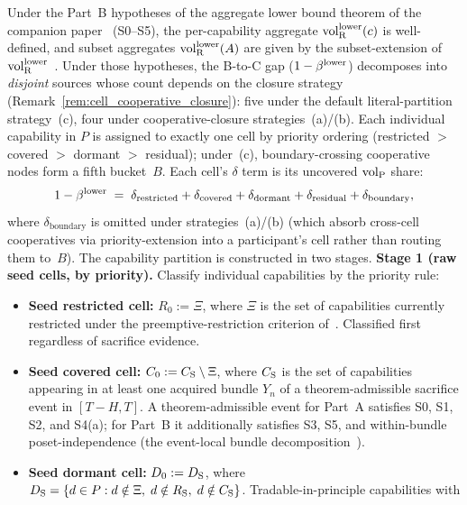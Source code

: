 \begin{definition}
\label{def:gap_decomp}
Under the Part~B hypotheses of the aggregate lower bound
theorem of the companion paper~\citep[Revealed~Sacrifice]{lasser2026paper8a}
(S0--S5), the per-capability aggregate ${\operatorname{vol}_{\mathrm{R}}^{\mathrm{lower}}}(c)$ is
well-defined, and subset aggregates ${\operatorname{vol}_{\mathrm{R}}^{\mathrm{lower}}}(A)$ are given
by the subset-extension of ${\operatorname{vol}_{\mathrm{R}}^{\mathrm{lower}}}$~\citep[Revealed~Sacrifice]{lasser2026paper8a}.  Under those
hypotheses, the B-to-C gap ($1 - \beta^{\mathrm{lower}}$) decomposes into
\emph{disjoint} sources whose count depends on the closure
strategy (Remark~\ref{rem:cell_cooperative_closure}): five
under the default literal-partition strategy~(c), four under
cooperative-closure strategies~(a)/(b).  Each individual
capability in $P$ is assigned to exactly one cell by priority
ordering (restricted $>$ covered $>$ dormant $>$ residual);
under~(c), boundary-crossing cooperative nodes form a fifth
bucket~$B$.  Each cell's $\delta$ term is its uncovered ${\operatorname{vol}_{\mathrm{P}}}$
share:
\[
  1 - \beta^{\mathrm{lower}} \;=\; \delta_{\mathrm{restricted}}
  + \delta_{\mathrm{covered}} + \delta_{\mathrm{dormant}}
  + \delta_{\mathrm{residual}}
  + \delta_{\mathrm{boundary}},
\]
where $\delta_{\mathrm{boundary}}$ is omitted under
strategies~(a)/(b) (which absorb cross-cell cooperatives via
priority-extension into a participant's cell rather than
routing them to~$B$).  The capability partition is constructed
in two stages.
\medskip\noindent
\textbf{Stage 1 (raw seed cells, by priority).}
Classify individual capabilities by the priority rule:
\begin{itemize}
\item \textbf{Seed restricted cell:} $R_0 := \Xi$, where $\Xi$
  is the set of capabilities currently restricted under the
  preemptive-restriction criterion
  of~\citep[Proposition~1]{lasser2026horizon}.  Classified first
  regardless of sacrifice evidence.
\item \textbf{Seed covered cell:} $C_0 := C_{\mathrm{S}} \setminus \Xi$,
  where $C_{\mathrm{S}}$ is the set of capabilities appearing in at
  least one acquired bundle $Y_n$ of a theorem-admissible
  sacrifice event in $[T - H, T]$.  A theorem-admissible event
  for Part~A satisfies S0, S1, S2, and S4(a); for Part~B it
  additionally satisfies S3, S5, and within-bundle
  poset-independence (the event-local bundle
  decomposition~\citep[Revealed~Sacrifice]{lasser2026paper8a}).
\item \textbf{Seed dormant cell:} $D_0 := D_{\mathrm{S}}$, where
  $D_{\mathrm{S}} = \{d \in P : d \notin \Xi,\; d \notin R_{\mathrm{S}},\;
  d \notin C_{\mathrm{S}}\}$.  Tradable-in-principle capabilities with

\end{itemize}
\end{definition}
